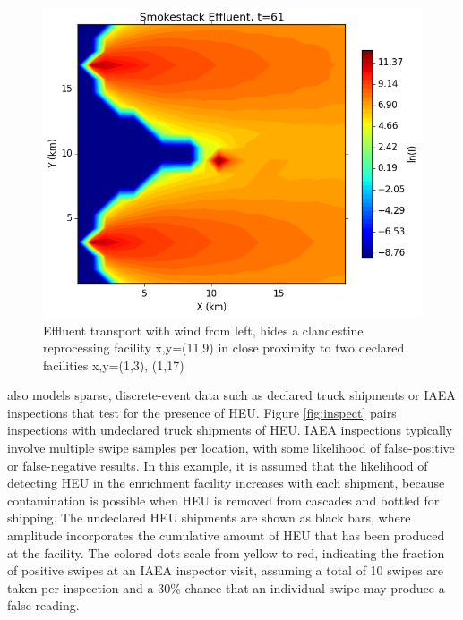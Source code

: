 \begin{figure}%
\begin{center}
\includegraphics[natwidth=162bp,natheight=227bp, scale=0.4]{./figs/proper_diff_fr61.png}
\end{center}
\caption{Effluent transport with wind from left, hides a clandestine reprocessing facility x,y=(11,9) in close proximity to two declared facilities x,y=(1,3), (1,17)}
\label{fig:effluent}
\end{figure}

\Cyclus also models sparse, discrete-event data such as declared truck shipments or IAEA inspections that test for the presence of \gls{HEU}. Figure \ref{fig:inspect} pairs inspections with undeclared truck shipments of \gls{HEU}.  IAEA inspections typically involve multiple swipe samples per location, with some likelihood of false-positive or false-negative results\cite{ryjinski_idms_2003}. In this example, it is assumed that the likelihood of detecting \gls{HEU} in the enrichment facility increases with each shipment, because contamination is possible when \gls{HEU} is removed from cascades and bottled for shipping.  The undeclared \gls{HEU} shipments are shown as black bars, where amplitude incorporates the cumulative amount of \gls{HEU} that has been produced at the facility. The colored dots scale from yellow to red, indicating the fraction of positive swipes at an \gls{IAEA} inspector visit, assuming a total of 10 swipes are taken per inspection and a 30\% chance that an individual swipe may produce a false reading.  

